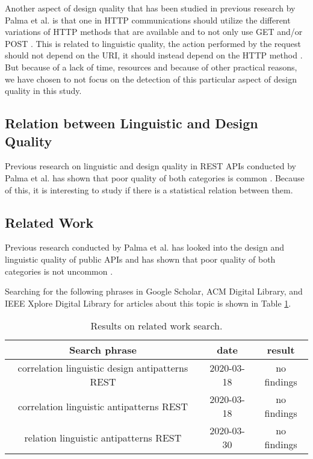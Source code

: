 Another aspect of design quality that has been studied in previous research by Palma et al. is that one in HTTP communications should utilize the different variations of HTTP methods that are available and to not only use GET and/or POST \cite{design}. This is related to linguistic quality, the action performed by the request should not depend on the URI, it should instead depend on the HTTP method \cite{linguistic}\cite{design}. But because of a lack of time, resources and because of other practical reasons, we have chosen to not focus on the detection of this particular aspect of design quality in this study. 


\subsection{Relation between Linguistic and Design Quality}

Previous research on linguistic and design quality in REST APIs conducted by Palma et al. has shown that poor quality of both categories is common \cite{linguistic}\cite{design}. Because of this, it is interesting to study if there is a statistical relation between them.


\subsection{Related Work}

Previous research conducted by Palma et al. has looked into the design and linguistic quality of public APIs and has shown that poor quality of both categories is not uncommon \cite{design}\cite{linguistic}.

Searching for the following phrases in Google Scholar, ACM Digital Library, and IEEE Xplore Digital Library for articles about this topic is shown in Table \ref{tab:Resultofrelatedworksearch}.

\begin{table}[!ht]
\begin{center}
\begin{tabular}{| c | c | c |}
\hline \textbf{Search phrase} & \textbf{date} & \textbf{result} \\
\hline 
correlation linguistic design antipatterns REST &
2020-03-18 & 
no findings
\\ \hline
correlation linguistic antipatterns REST &
2020-03-18 &
no findings
\\ \hline
relation linguistic antipatterns REST &
2020-03-30 & 
no findings
\\ \hline
\end{tabular}
 \caption{Results on related work search.}
 \label{tab:Resultofrelatedworksearch}
\end{center}
\end{table}

